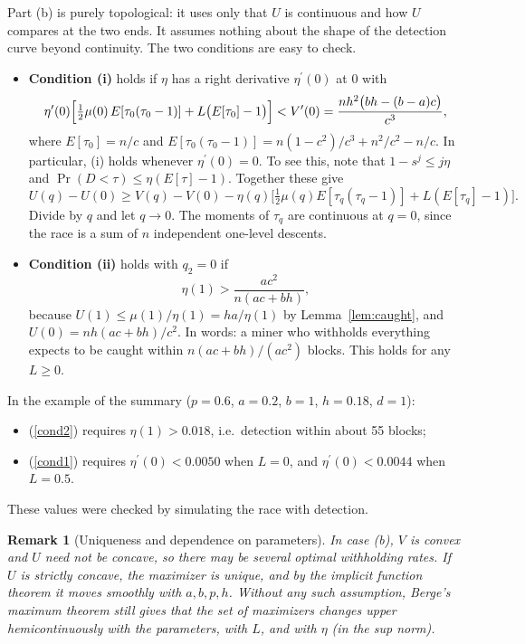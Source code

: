 \documentclass{article}%
\newtheorem{remark}[theorem]{Remark}
\begin{document}
Part (b) is purely topological: it uses only that $U$ is continuous and how $U$
compares at the two ends. It assumes nothing about the shape of the detection
curve beyond continuity. The two conditions are easy to check.

\begin{itemize}
\item \textbf{Condition (i)} holds if $\eta$ has a right derivative
$\eta^{\prime}(0)$ at $0$ with
\begin{equation}
\eta^{\prime}(0)\Bigl[\tfrac{1}{2}\mu(0)\,E[\tau_{0}(\tau_{0}-1)]+L\bigl(E[\tau
_{0}]-1\bigr)\Bigr]<V^{\prime}(0)=\frac{nh^{2}\bigl(bh-(b-a)c\bigr)}{c^{3}},
\label{cond1}%
\end{equation}
where $E[\tau_{0}]=n/c$ and $E[\tau_{0}(\tau_{0}-1)]=n(1-c^{2})/c^{3}%
+n^{2}/c^{2}-n/c$. In particular, (i) holds whenever $\eta^{\prime}(0)=0$. To
see this, note that $1-s^{j}\leq j\eta$ and $\Pr(D<\tau)\leq\eta(E[\tau]-1)$.
Together these give
\[
U(q)-U(0)\geq V(q)-V(0)-\eta(q)\bigl[\tfrac{1}{2}\mu(q)E[\tau_{q}(\tau
_{q}-1)]+L(E[\tau_{q}]-1)\bigr].
\]
Divide by $q$ and let $q\rightarrow0$. The moments of $\tau_{q}$ are
continuous at $q=0$, since the race is a sum of $n$ independent one-level
descents.

\item \textbf{Condition (ii)} holds with $q_{2}=0$ if
\begin{equation}
\eta(1)>\frac{ac^{2}}{n(ac+bh)}, \label{cond2}%
\end{equation}
because $U(1)\leq\mu(1)/\eta(1)=ha/\eta(1)$ by Lemma~\ref{lem:caught}, and
$U(0)=nh(ac+bh)/c^{2}$. In words: a miner who withholds everything expects to
be caught within $n(ac+bh)/(ac^{2})$ blocks. This holds for any $L\geq0$.
\end{itemize}

\noindent In the example of the summary ($p=0.6$, $a=0.2$, $b=1$, $h=0.18$,
$d=1$):
\begin{itemize}
\item (\ref{cond2}) requires $\eta(1)>0.018$, i.e.\ detection within about 55
blocks;
\item (\ref{cond1}) requires $\eta^{\prime}(0)<0.0050$ when $L=0$, and
$\eta^{\prime}(0)<0.0044$ when $L=0.5$.
\end{itemize}
These values were checked by simulating the race with detection.

\begin{remark}[Uniqueness and dependence on parameters]
In case (b), $V$ is convex and $U$ need not be concave, so there may be
several optimal withholding rates. If $U$ is strictly concave, the maximizer
is unique, and by the implicit function theorem it moves smoothly with
$a,b,p,h$. Without any such assumption, Berge's maximum theorem still gives
that the set of maximizers changes upper hemicontinuously with the parameters,
with $L$, and with $\eta$ (in the sup norm).
\end{remark}
\end{document}

